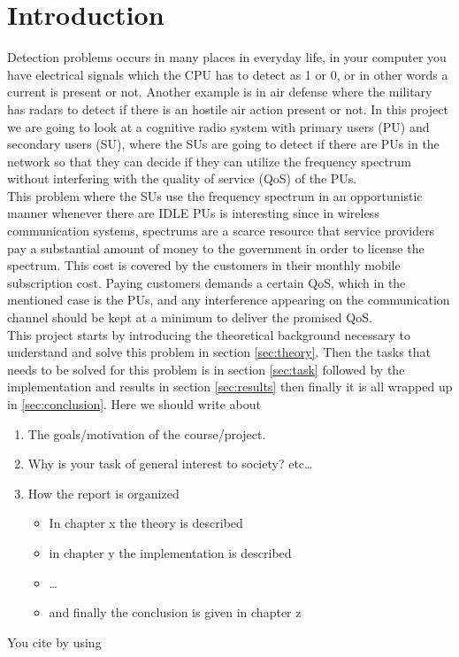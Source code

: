 \section{Introduction}\label{sec:intro}
Detection problems occurs in many places in everyday life, in your computer you have electrical signals which the CPU has to detect as 1 or 0, or in other words a current is present or not. Another example is in air defense where the military has radars to detect if there is an hostile air action present or not. In this project we are going to look at a cognitive radio system with primary users (PU) and secondary users (SU), where the SUs are going to detect if there are PUs in the network so that they can decide if they can utilize the frequency spectrum without interfering with the quality of service (QoS) of the PUs.\\
This problem where the SUs use the frequency spectrum in an opportunistic manner whenever there are IDLE PUs is interesting since in wireless communication systems, spectrums are a scarce resource that service providers pay a substantial amount of money to the government in order to license the spectrum. This cost is covered by the customers in their monthly mobile subscription cost. Paying customers demands a certain QoS, which in the mentioned case is the PUs, and any interference appearing on the communication channel should be kept at a minimum to deliver the promised QoS.\\
This project starts by introducing the theoretical background necessary to understand and solve this problem in section \ref{sec:theory}. Then the tasks that needs to be solved for this problem is in section \ref{sec:task} followed by the implementation and results in section \ref{sec:results} then finally it is all wrapped up in \ref{sec:conclusion}.
Here we should write about
\begin{enumerate}[i]
	\item The goals/motivation of the course/project.
	\item Why is your task of general interest to society? etc\dots
	\item How the report is organized
	\begin{itemize}
		\item In chapter x the theory is described
		\item in chapter y the implementation is described
		\item \dots
		\item and finally the conclusion is given in chapter z
	\end{itemize}
\end{enumerate}

You cite by using \cite{Chen2014}